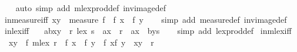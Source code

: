 \begin{isabellebody}
%
\isadelimproof
\ \ %
\endisadelimproof
%
\isatagproof
{}\isamarkupfalse%
\ {\isacharparenleft}auto\ simp\ add{\isacharcolon}\ mlex{\isacharunderscore}prod{\isacharunderscore}def\ inv{\isacharunderscore}image{\isacharunderscore}def{\isacharparenright}%
\endisatagproof
{\isafoldproof}%
%
\isadelimproof
\isanewline
%
\endisadelimproof
\isanewline
{}\isamarkupfalse%
\ in{\isacharunderscore}measure{\isacharunderscore}iff{\isacharcolon}\ {\isachardoublequoteopen}{\isacharparenleft}x{\isacharcomma}y{\isacharparenright}\ {\isasymin}\ measure\ f\ {\isacharequal}\ {\isacharparenleft}f\ x\ {\isacharless}\ f\ y{\isacharparenright}{\isachardoublequoteclose}\isanewline
%
\isadelimproof
\ \ %
\endisadelimproof
%
\isatagproof
{}\isamarkupfalse%
\ {\isacharparenleft}simp\ add{\isacharcolon}\ measure{\isacharunderscore}def\ inv{\isacharunderscore}image{\isacharunderscore}def{\isacharparenright}%
\endisatagproof
{\isafoldproof}%
%
\isadelimproof
\isanewline
%
\endisadelimproof
\isanewline
{}\isamarkupfalse%
\ in{\isacharunderscore}lex{\isacharunderscore}iff{\isacharcolon}\ \isanewline
\ \ {\isachardoublequoteopen}{\isacharparenleft}{\isacharparenleft}a{\isacharcomma}b{\isacharparenright}{\isacharcomma}{\isacharparenleft}x{\isacharcomma}y{\isacharparenright}{\isacharparenright}\ {\isasymin}\ r\ {\isacharless}{\isacharasterisk}lex{\isacharasterisk}{\isachargreater}\ s\ {\isacharequal}\ {\isacharparenleft}{\isacharparenleft}a{\isacharcomma}x{\isacharparenright}\ {\isasymin}\ r\ {\isasymor}\ {\isacharparenleft}a{\isacharequal}x\ {\isasymand}\ {\isacharparenleft}b{\isacharcomma}y{\isacharparenright}{\isasymin}s{\isacharparenright}{\isacharparenright}{\isachardoublequoteclose}\isanewline
%
\isadelimproof
\ \ %
\endisadelimproof
%
\isatagproof
{}\isamarkupfalse%
\ {\isacharparenleft}simp\ add{\isacharcolon}\ lex{\isacharunderscore}prod{\isacharunderscore}def{\isacharparenright}%
\endisatagproof
{\isafoldproof}%
%
\isadelimproof
\isanewline
%
\endisadelimproof
\isanewline
{}\isamarkupfalse%
\ in{\isacharunderscore}mlex{\isacharunderscore}iff{\isacharcolon}\isanewline
\ \ {\isachardoublequoteopen}{\isacharparenleft}x{\isacharcomma}y{\isacharparenright}\ {\isasymin}\ f\ {\isacharless}{\isacharasterisk}mlex{\isacharasterisk}{\isachargreater}\ r\ {\isacharequal}\ {\isacharparenleft}f\ x\ {\isacharless}\ f\ y\ {\isasymor}\ {\isacharparenleft}f\ x{\isacharequal}f\ y\ {\isasymand}\ {\isacharparenleft}x{\isacharcomma}y{\isacharparenright}\ {\isasymin}\ r{\isacharparenright}{\isacharparenright}{\isachardoublequoteclose}\isanewline

\end{isabellebody}
